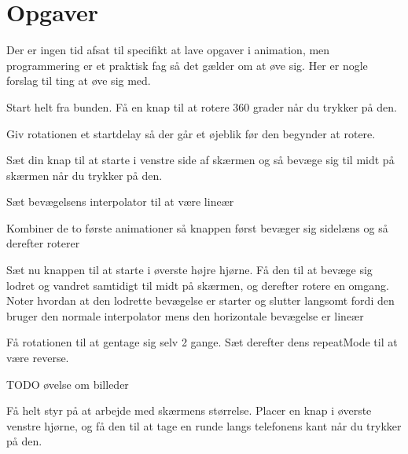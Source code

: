 \section{Opgaver}
Der er ingen tid afsat til specifikt at lave opgaver i animation, men programmering er et praktisk fag så det gælder om at øve sig. Her er nogle forslag til ting at øve sig med.
\begin{exercise}
	Start helt fra bunden. Få en knap til at rotere 360 grader når du trykker på den.
\end{exercise}
\begin{exercise}
	Giv rotationen et startdelay så der går et øjeblik før den begynder at rotere.
\end{exercise}
\begin{exercise}
	Sæt din knap til at starte i venstre side af skærmen og så bevæge sig til midt på skærmen når du trykker på den.
\end{exercise}
\begin{exercise}
	Sæt bevægelsens interpolator til at være lineær
\end{exercise}
\begin{exercise}
	Kombiner de to første animationer så knappen først bevæger sig sidelæns og så derefter roterer
\end{exercise}
\begin{exercise}
	Sæt nu knappen til at starte i øverste højre hjørne. Få den til at bevæge sig lodret og vandret samtidigt til midt på skærmen, og derefter rotere en omgang. Noter hvordan at den lodrette bevægelse er starter og slutter langsomt fordi den bruger den normale interpolator mens den horizontale bevægelse er lineær
\end{exercise}
\begin{exercise}
	Få rotationen til at gentage sig selv 2 gange. Sæt derefter dens repeatMode til at være reverse.
\end{exercise}
\begin{exercise}
	TODO øvelse om billeder
\end{exercise}
\begin{exercise}
	Få helt styr på at arbejde med skærmens størrelse. Placer en knap i øverste venstre hjørne, og få den til at tage en runde langs telefonens kant når du trykker på den. 
\end{exercise}